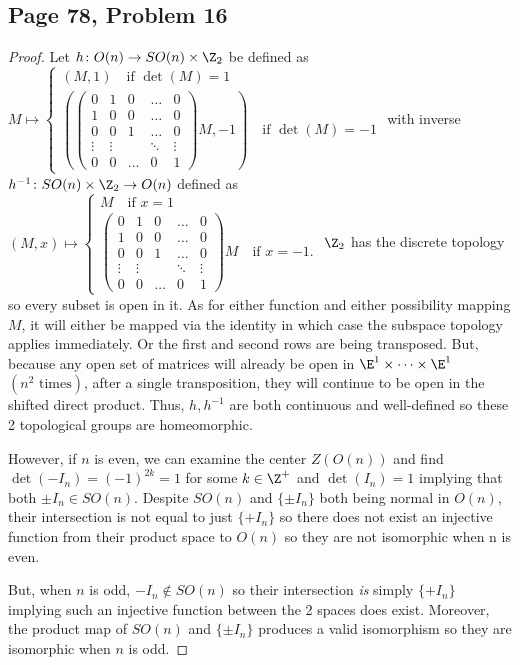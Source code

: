 \subsection*{Page 78, Problem 16}
\vspace{15pt}
\begin{proof}
    \vspace{-10pt}
    Let $h\colon O(n)\to SO(n)\times\Z_2$ be defined as $M\mapsto\begin{cases}(M, 1) \quad\text{if }\det(M) = 1 \\ \left(\begin{pmatrix}
        0 & 1 & 0 & \dots & 0 \\
        1 & 0 & 0 & \dots & 0 \\
        0 & 0 & 1 & \dots & 0 \\
        \vdots & \vdots & & \ddots & \vdots \\
        0 & 0 & \dots & 0 & 1
      \end{pmatrix}M,-1\right) \quad \text{if }\det(M) = -1\end{cases}$
    with inverse $h^{-1}\colon SO(n)\times\Z_2\to O(n)$ defined as $(M,x)\mapsto\begin{cases}M \quad\text{if }x = 1 \\ \begin{pmatrix}
        0 & 1 & 0 & \dots & 0 \\
        1 & 0 & 0 & \dots & 0 \\
        0 & 0 & 1 & \dots & 0 \\
        \vdots & \vdots & & \ddots & \vdots \\
        0 & 0 & \dots & 0 & 1
      \end{pmatrix}M \quad \text{if }x = -1.\end{cases}$
    $\Z_2$ has the discrete topology so every subset is open in it. As for either function and either possibility mapping $M$, it will either be mapped via the identity in which case the subspace topology applies immediately. Or the first and second rows are being transposed. But, because any open set of matrices will already be open in $\E^1 \times\cdots\times\E^1$ $(n^2 \text{ times})$, after a single transposition, they will continue to be open in the shifted direct product. Thus, $h, h^{-1}$ are both continuous and well-defined so these 2 topological groups are homeomorphic.
    
    However, if $n$ is even, we can examine the center $Z(O(n))$ and find $\det(-I_n)=(-1)^{2k}=1$ for some $k \in \Z^+$ and $\det(I_n) = 1$ implying that both $\pm I_n \in SO(n)$. Despite $SO(n)$ and $\{\pm I_n\}$ both being normal in $O(n)$, their intersection is not equal to just $\{+I_n\}$ so there does not exist an injective function from their product space to $O(n)$ so they are not isomorphic when n is even.

    But, when $n$ is odd, $-I_n \notin SO(n)$ so their intersection \emph{is} simply $\{+I_n\}$ implying such an injective function between the 2 spaces does exist. Moreover, the product map of $SO(n)$ and $\{\pm I_n\}$ produces a valid isomorphism so they are isomorphic when $n$ is odd.
\end{proof}

